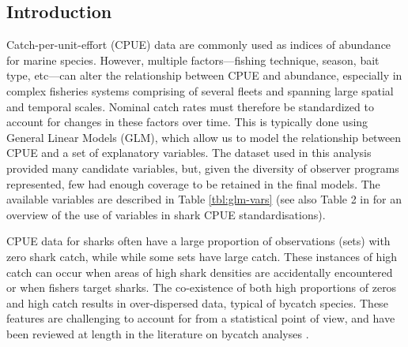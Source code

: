 
%




\subsection{Introduction}



Catch-per-unit-effort (CPUE) data are commonly used as indices of abundance for marine species. However, multiple factors---fishing technique, season, bait type, etc---can alter the relationship between CPUE and abundance, especially in complex fisheries systems comprising of several fleets and spanning large spatial and temporal scales. Nominal catch rates must therefore be standardized to account for changes in these factors over time. This is typically done using General Linear Models (GLM), which allow us to model the relationship between CPUE and a set of explanatory variables. The dataset used in this analysis provided many candidate variables, but, given the diversity of observer programs represented, few had enough coverage to be retained in the final models. The available variables are described in Table \ref{tbl:glm-vars} (see also Table 2 in \citet{Francis2014_b} for an overview of the use of variables in shark CPUE standardisations).

CPUE data for sharks often have a large proportion of observations (sets) with zero shark catch, while while some sets have large catch. These instances of high catch can occur when areas of high shark densities are accidentally encountered or when fishers target sharks. The co-existence of both high proportions of zeros and high catch results in over-dispersed data, typical of bycatch species. These features are challenging to account for from a statistical point of view, and have been reviewed at length in the literature on bycatch analyses \citep{Bigelow2002_a,Campbell2004_a,Ward2005_a,Minami2007_a}. 

